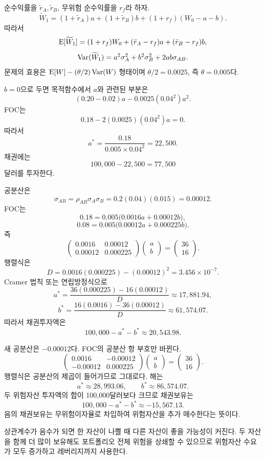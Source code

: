 \begin{solutionbox}
순수익률을 $\widetilde r_A,\widetilde r_B$, 무위험 순수익률을 $r_f$라 하자.
\[
\widetilde W_1=(1+\widetilde r_A)a+(1+\widetilde r_B)b+(1+r_f)(W_0-a-b).
\]
따라서
\[
\operatorname{E}[\widetilde W_1]=(1+r_f)W_0+(\bar r_A-r_f)a+(\bar r_B-r_f)b,
\]
\[
\operatorname{Var}(\widetilde W_1)=a^2\sigma_A^2+b^2\sigma_B^2+2ab\sigma_{AB}.
\]
문제의 효용은 $\operatorname{E}[W]-(\theta/2)\operatorname{Var}(W)$ 형태이며 $\theta/2=0.0025$, 즉 $\theta=0.005$다.

$b=0$으로 두면 목적함수에서 $a$와 관련된 부분은
\[
(0.20-0.02)a-0.0025(0.04^2)a^2.
\]
FOC는
\[
0.18-2(0.0025)(0.04^2)a=0.
\]
따라서
\[
a^*=\frac{0.18}{0.005\times0.04^2}=22{,}500.
\]
채권에는
\[
100{,}000-22{,}500=77{,}500
\]
달러를 투자한다.

공분산은
\[
\sigma_{AB}=\rho_{AB}\sigma_A\sigma_B
=0.2(0.04)(0.015)=0.00012.
\]
FOC는
\[
0.18=0.005\bigl(0.0016a+0.00012b\bigr),
\]
\[
0.08=0.005\bigl(0.00012a+0.000225b\bigr).
\]
즉
\[
\begin{pmatrix}
0.0016&0.00012\\
0.00012&0.000225
\end{pmatrix}
\begin{pmatrix}a\\b\end{pmatrix}
=
\begin{pmatrix}36\\16\end{pmatrix}.
\]
행렬식은
\[
D=0.0016(0.000225)-(0.00012)^2=3.456\times10^{-7}.
\]
Cramer 법칙 또는 연립방정식으로
\[
a^*=\frac{36(0.000225)-16(0.00012)}{D}
\approx17{,}881.94,
\]
\[
b^*=\frac{16(0.0016)-36(0.00012)}{D}
\approx61{,}574.07.
\]
따라서 채권투자액은
\[
100{,}000-a^*-b^*\approx20{,}543.98.
\]

새 공분산은 $-0.00012$다. FOC의 공분산 항 부호만 바뀐다.
\[
\begin{pmatrix}
0.0016&-0.00012\\
-0.00012&0.000225
\end{pmatrix}
\begin{pmatrix}a\\b\end{pmatrix}
=
\begin{pmatrix}36\\16\end{pmatrix}.
\]
행렬식은 공분산의 제곱이 들어가므로 그대로다. 해는
\[
a^*\approx28{,}993.06,
\qquad b^*\approx86{,}574.07.
\]
두 위험자산 투자액의 합이 100,000달러보다 크므로 채권보유는
\[
100{,}000-a^*-b^*\approx-15{,}567.13.
\]
음의 채권보유는 무위험이자율로 차입하여 위험자산을 추가 매수한다는 뜻이다.

상관계수가 음수가 되면 한 자산이 나쁠 때 다른 자산이 좋을 가능성이 커진다. 두 자산을 함께 더 많이 보유해도 포트폴리오 전체 위험을 상쇄할 수 있으므로 위험자산 수요가 모두 증가하고 레버리지까지 사용한다.
\end{solutionbox}

